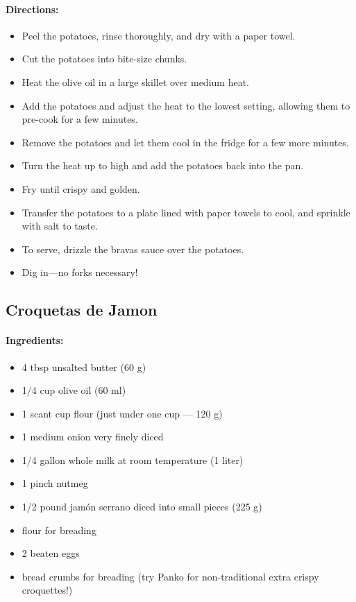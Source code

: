 \documentclass{article}
\begin{document}
\paragraph{Directions:}
\begin{itemize}
    \item Peel the potatoes, rinse thoroughly, and dry with a paper towel.
    \item Cut the potatoes into bite-size chunks.
    \item Heat the olive oil in a large skillet over medium heat.
    \item Add the potatoes and adjust the heat to the lowest setting, allowing them to pre-cook for a few minutes.
    \item Remove the potatoes and let them cool in the fridge for a few more minutes.
    \item Turn the heat up to high and add the potatoes back into the pan.
    \item Fry until crispy and golden.
    \item Transfer the potatoes to a plate lined with paper towels to cool, and sprinkle with salt to taste.
    \item To serve, drizzle the bravas sauce over the potatoes.
    \item Dig in—no forks necessary!
\end{itemize}

\subsection{Croquetas de Jamon}

\paragraph{Ingredients:}
\begin{itemize}
    \item 4 tbsp unsalted butter (60 g)
    \item 1/4 cup olive oil (60 ml)
    \item 1 scant cup flour (just under one cup — 120 g)
    \item 1 medium onion very finely diced
    \item 1/4 gallon whole milk at room temperature (1 liter)
    \item 1 pinch nutmeg
    \item 1/2 pound jamón serrano diced into small pieces (225 g)
    \item flour for breading
    \item 2 beaten eggs
    \item bread crumbs for breading (try Panko for non-traditional extra crispy croquettes!)
\end{itemize}
\end{document}
